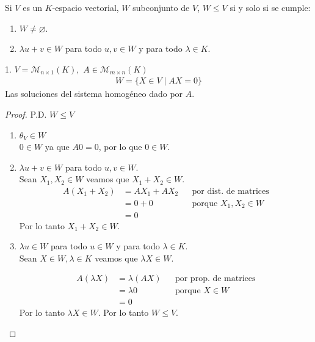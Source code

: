 \begin{obs}{}{}
    Si $V$ es un $K$-espacio vectorial, $W$ subconjunto de $V$, $W \leq V$ si y solo si se cumple:
    \begin{enumerate}
        \item $W \neq \varnothing$.
        \item $\lambda u + v \in W$ para todo $u,v \in W$ y para todo $\lambda \in K$.
    \end{enumerate}
\end{obs}


\begin{example}{}{}
    1. $V= \mathcal{M}_{n \times 1} (K), \, \, A \in \mathcal{M}_{m \times n} (K)$
    \begin{align*}
        W = \{X \in V \mid AX = 0\}
    \end{align*}
    Las soluciones del sistema homogéneo dado por $A$.
\end{example}
\begin{proof}
    P.D. $W \leq V$\\

    \begin{enumerate}
        \item $\theta_V \in W$\\
        $0 \in W$ ya que $A0 = 0$, por lo que $0 \in W$.


        \item $\lambda u + v \in W$ para todo $u,v \in W$.\\
        Sean $X_1,X_2 \in W$ veamos que $ X_1 + X_2 \in W$. 
        \begin{align*}
            A(X_1 + X_2) &= AX_1 + AX_2 && \text{por dist. de matrices} \\
            &= 0 + 0 && \text{porque } X_1,X_2 \in W\\
            &= 0
        \end{align*}
        Por lo tanto $X_1 + X_2 \in W$.\\

        \item $\lambda u \in W$ para todo $u \in W$ y para todo $\lambda \in K$.\\
        Sean $X \in W, \lambda \in K$ veamos que $\lambda X \in W$.

        \begin{align*}
            A(\lambda X) &= \lambda (AX) && \text{por prop. de matrices} \\
            &= \lambda 0 && \text{porque } X \in W\\
            &= 0
        \end{align*}
        Por lo tanto $\lambda X \in W$.
        Por lo tanto $W \leq V$.
    \end{enumerate}
\end{proof}


